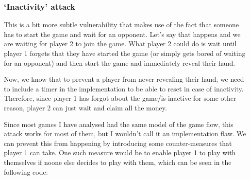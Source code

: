 \documentclass{article}
\begin{document}
    \subsubsection{`Inactivity' attack} \label{s:playown}
    This is a bit more subtle vulnerability that makes use
    of the fact that someone has to start the game and wait
    for an opponent. Let's say that happens and we are
    waiting for player 2 to join the game. What player 2
    could do is wait until player 1 forgets that they have
    started the game (or simply gets bored of waiting for an
    opponent) and then start the game and immediately reveal
    their hand.
    \newline

    \noindent Now, we know that to prevent a player from
    never revealing their hand, we need to include a timer
    in the implementation to be able to reset in case of
    inactivity. Therefore, since player 1 has forgot about
    the game/is inactive for some other reason, player 2
    can just wait and claim all the money.
    \newline
    
    \noindent Since most games I have analysed had the same
    model of the game flow, this attack works for most of
    them, but I wouldn't call it an implementation flaw. We
    can prevent this from happening by introducing some
    counter-measures that player 1 can take. One such
    measure would be to enable player 1 to play with
    themselves if noone else decides to play with them,
    which can be seen in the following code:
\end{document}
